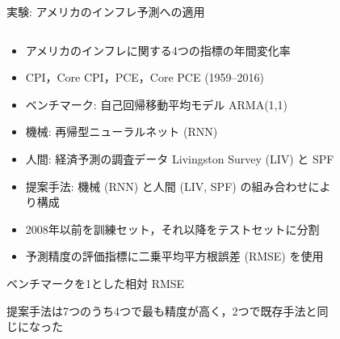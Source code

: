 \documentclass[dvipdfmx]{beamer}
\begin{document}
\begin{frame}{}
  \begin{block}{実験: アメリカのインフレ予測への適用}
    \begin{columns}
      \begin{column}{.49\textwidth}
        \begin{itemize}
          \item アメリカのインフレに関する4つの指標の年間変化率
          \item CPI，Core CPI，PCE，Core PCE (1959--2016)
        \end{itemize}
        \smallskip
        \begin{itemize}
          \item ベンチマーク: 自己回帰移動平均モデル ARMA(1,1)
          \item 機械: 再帰型ニューラルネット (RNN)
          \item 人間: 経済予測の調査データ Livingston Survey (LIV) と SPF
          \item 提案手法: 機械 (RNN) と人間 (LIV, SPF) の組み合わせにより構成
        \end{itemize}
        \smallskip
        \begin{itemize}
          \item 2008年以前を訓練セット，それ以降をテストセットに分割
          \item 予測精度の評価指標に二乗平均平方根誤差 (RMSE) を使用
        \end{itemize}
        \smallskip
        \begin{table}
          \caption{ベンチマークを1とした相対 RMSE}
          \begin{center}
            
          \end{center}
        \end{table}
        \begin{itembox}[l]{}
          \alert{提案手法は7つのうち4つで最も精度が高く，2つで既存手法と同じになった}
        \end{itembox}
      \end{column}
      \begin{column}{.49\textwidth}
        \begin{figure}
          \centering

\end{figure}
\end{column}
\end{columns}
\end{block}
\end{frame}
\end{document}
